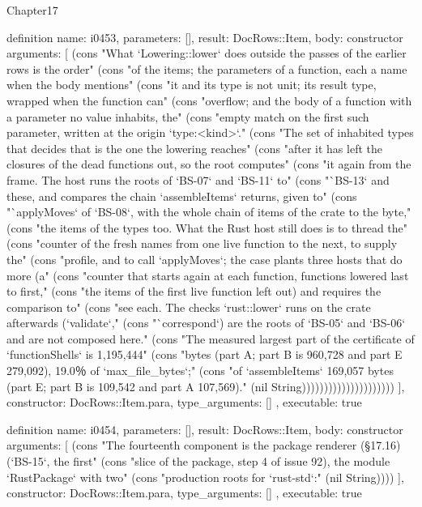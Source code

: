\begin{lexlean}{Chapter17}
\begin{semanticmodule}
definition{
  name: i0453,
  parameters: [],
  result: DocRows::Item,
  body: constructor{
    arguments: [
      (cons "What `Lowering::lower` does outside the passes of the earlier rows is the order" (cons "of the items; the parameters of a function, each a name when the body mentions" (cons "it and its type is not unit; its result type, wrapped when the function can" (cons "overflow; and the body of a function with a parameter no value inhabits, the" (cons "empty match on the first such parameter, written at the origin `type:<kind>`." (cons "The set of inhabited types that decides that is the one the lowering reaches" (cons "after it has left the closures of the dead functions out, so the root computes" (cons "it again from the frame. The host runs the roots of `BS-07` and `BS-11` to" (cons "`BS-13` and these, and compares the chain `assembleItems` returns, given to" (cons "`applyMoves` of `BS-08`, with the whole chain of items of the crate to the byte," (cons "the items of the types too. What the Rust host still does is to thread the" (cons "counter of the fresh names from one live function to the next, to supply the" (cons "profile, and to call `applyMoves`; the case plants three hosts that do more (a" (cons "counter that starts again at each function, functions lowered last to first," (cons "the items of the first live function left out) and requires the comparison to" (cons "see each. The checks `rust::lower` runs on the crate afterwards (`validate`," (cons "`correspond`) are the roots of `BS-05` and `BS-06` and are not composed here." (cons "The measured largest part of the certificate of `functionShells` is 1,195,444" (cons "bytes (part A; part B is 960,728 and part E 279,092), 19.0％ of `max_file_bytes`;" (cons "of `assembleItems` 169,057 bytes (part E; part B is 109,542 and part A 107,569)." (nil String)))))))))))))))))))))
    ],
    constructor: DocRows::Item.para,
    type_arguments: []
  },
  executable: true
}

definition{
  name: i0454,
  parameters: [],
  result: DocRows::Item,
  body: constructor{
    arguments: [
      (cons "The fourteenth component is the package renderer (§17.16) (`BS-15`, the first" (cons "slice of the package, step 4 of issue 92), the module `RustPackage` with two" (cons "production roots for `rust-std`:" (nil String))))
    ],
    constructor: DocRows::Item.para,
    type_arguments: []
  },
  executable: true
}


\end{semanticmodule}
\end{lexlean}
